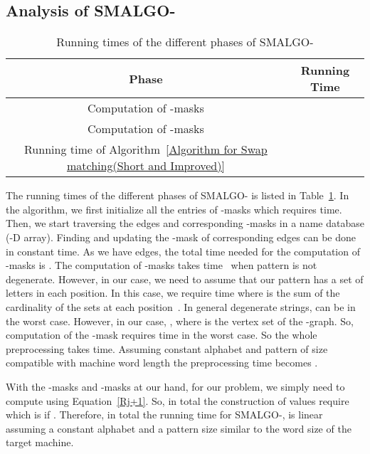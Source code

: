 \documentclass{llncs}
\newcommand{\rom}[1]{\uppercase\expandafter{\romannumeral #1\relax}}
\begin{document}
{\subsection{Analysis of SMALGO-\rom{1}}

\begin{table}
\begin{center}
\begin{tabular}{|c|c|}
\hline
Phase&Running Time\\
\hline
Computation of -masks&\\
\hline
Computation of -masks&\\
\hline
Running time of Algorithm~\ref{Algorithm for Swap matching(Short and Improved)}&\\
\hline
\end{tabular}
\caption{Running times of the different phases of SMALGO-\rom{1}}
\label{Table_RunningTime1}
\end{center}
\end{table}


The running times of the different phases of SMALGO-\rom{1} is listed in Table~\ref{Table_RunningTime1}. In the algorithm, we first initialize all the entries of -masks which requires  time. Then, we start traversing the edges and corresponding -masks in a name database (-D array). Finding and updating the -mask of corresponding edges can be done in constant time. As we have  edges, the total time needed for the computation of -masks is . 
The computation of -masks takes  time~\cite{BG92} when pattern is not degenerate. However, in our case, we need to assume that our pattern has a set of letters in each position. In this case, we require  time where  is the sum of the cardinality of the sets at each position~\cite{BG92}. In general degenerate strings,  can be  in the worst case. However, in our case, , where  is the vertex set of the -graph. So, computation of the -mask requires  time in the worst case. So the whole preprocessing takes  time. Assuming constant alphabet  and pattern of size compatible with machine word length the preprocessing time becomes .


With the -masks and -masks at our hand, for our problem, we simply need to compute  using Equation~\ref{Rj+1}. So, in total the construction of  values require  which is  if . Therefore, in total the running time for SMALGO-\rom{1}, is linear 
assuming a constant alphabet and a pattern size similar to the word size of the target machine.
















}
\end{document}
